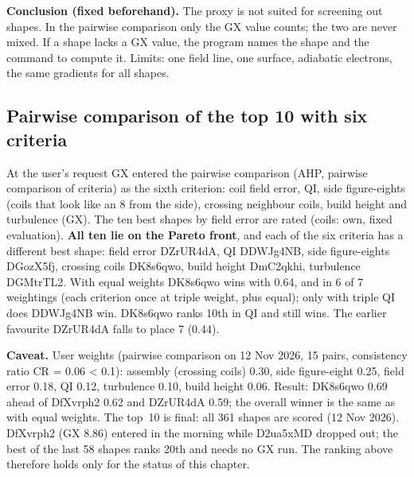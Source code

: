 \textbf{Conclusion (fixed beforehand).} The proxy is not suited for screening out shapes. In the pairwise comparison only the GX value counts; the two are never mixed. If a shape lacks a GX value, the program names the shape and the command to compute it.
Limits: one field line, one surface, adiabatic electrons, the same gradients for all shapes.

\subsection{Pairwise comparison of the top 10 with six criteria}
At the user's request GX entered the pairwise comparison (AHP, pairwise comparison of criteria) as the sixth criterion: coil field error, QI, side figure-eights (coils that look like an 8 from the side), crossing neighbour coils, build height and turbulence (GX).
The ten best shapes by field error are rated (coils: own, fixed evaluation). \textbf{All ten lie on the Pareto front}, and each of the six criteria has a different best shape: field error DZrUR4dA, QI DDWJg4NB, side figure-eights DGozX5fj, crossing coils DK8s6qwo,
build height DmC2qkhi, turbulence DGMtrTL2. With equal weights DK8s6qwo wins with 0.64, and in 6 of 7 weightings (each criterion once at triple weight, plus equal); only with triple QI does DDWJg4NB win. DK8s6qwo ranks 10th in QI and still wins.
The earlier favourite DZrUR4dA falls to place 7 (0.44).

\textbf{Caveat.} User weights (pairwise comparison on 12 Nov 2026, 15 pairs, consistency ratio CR = 0.06 < 0.1): assembly (crossing coils) 0.30, side figure-eight 0.25, field error 0.18, QI 0.12, turbulence 0.10, build height 0.06. Result: DK8s6qwo 0.69 ahead of DfXvrph2 0.62 and DZrUR4dA 0.59; the overall winner is the same as with equal weights. The top~10 is final: all 361 shapes are scored (12 Nov 2026). DfXvrph2 (GX 8.86) entered in the morning while D2ua5xMD dropped out; the best of the last 58 shapes ranks 20th and needs no GX run.
The ranking above therefore holds only for the status of this chapter.
